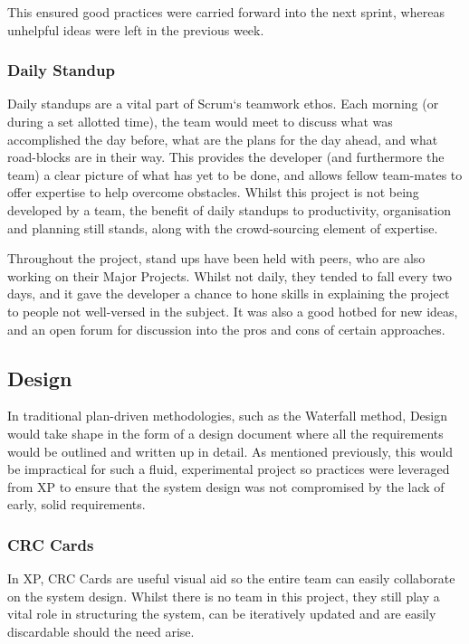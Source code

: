This ensured good practices were carried forward into the next sprint, whereas unhelpful ideas were left in the previous week.

\subsubsection{Daily Standup}

Daily standups are a vital part of Scrum`s teamwork ethos. Each morning (or during a set allotted time), the team would meet to discuss what was accomplished the day before, what are the plans for the day ahead, and what road-blocks are in their way. This provides the developer (and furthermore the team) a clear picture of what has yet to be done, and allows fellow team-mates to offer expertise to help overcome obstacles. Whilst this project is not being developed by a team, the benefit of daily standups to productivity, organisation and planning still stands, along with the crowd-sourcing element of expertise.

Throughout the project, stand ups have been held with peers, who are also working on their Major Projects. Whilst not daily, they tended to fall every two days, and it gave the developer a chance to hone skills in explaining the project to people not well-versed in the subject. It was also a good hotbed for new ideas, and an open forum for discussion into the pros and cons of certain approaches.

\subsection{Design}

In traditional plan-driven methodologies, such as the Waterfall method, Design would take shape in the form of a design document where all the requirements would be outlined and written up in detail. As mentioned previously, this would be impractical for such a fluid, experimental project so practices were leveraged from \acrfull{XP} to ensure that the system design was not compromised by the lack of early, solid requirements.

\subsubsection{CRC Cards}

In \acrshort{XP}, \acrfull{CRC} Cards are useful visual aid so the entire team can easily collaborate on the system design. Whilst there is no team in this project, they still play a vital role in structuring the system, can be iteratively updated and are easily discardable should the need arise.

